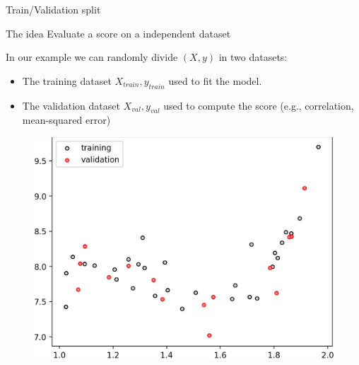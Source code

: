 \documentclass[handout, 10pt]{beamer}
\begin{document}
\begin{frame}{Train/Validation split}
\begin{block}{The idea}
Evaluate a score on a independent dataset
\end{block}
\pause
In our example we can randomly divide $(X,y)$ in two datasets:
\begin{itemize}
    \item The training dataset $X_{train},y_{train}$ used to fit the  model.
    \item The validation dataset $X_{val},y_{val}$ used to compute the score (e.g., correlation, mean-squared error)
\end{itemize}

    \begin{figure}
    \includegraphics[width=.4\textwidth]{datasplit.png}
    \end{figure}

\end{frame}
\end{document}
